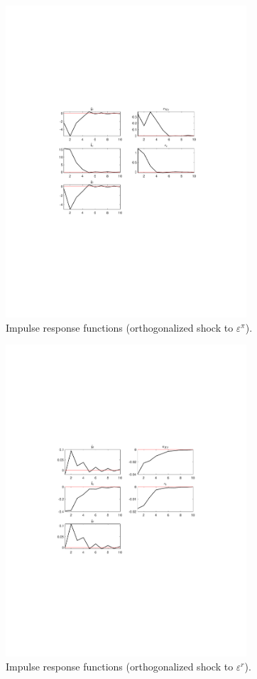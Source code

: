 \begin{figure}[H]
\centering 
\includegraphics[width=0.80\textwidth]{fiscal/graphs/fiscal_IRF_eps_pi}
\caption{Impulse response functions (orthogonalized shock to ${\varepsilon^{\pi}}$).}
\label{Fig:IRF:eps_pi}
\end{figure}
 
\begin{figure}[H]
\centering 
\includegraphics[width=0.80\textwidth]{fiscal/graphs/fiscal_IRF_eps_r}
\caption{Impulse response functions (orthogonalized shock to ${\varepsilon^{r}}$).}
\label{Fig:IRF:eps_r}
\end{figure}
 
